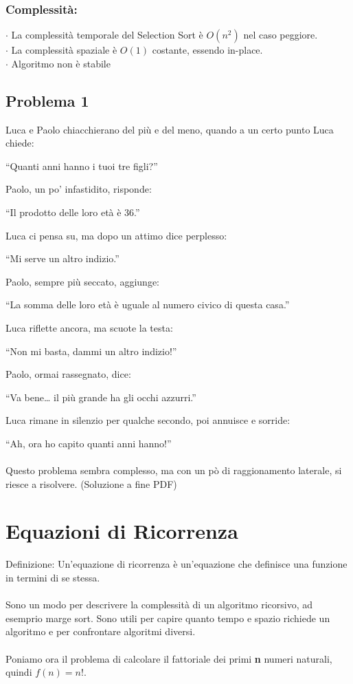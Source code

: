 \documentclass[a4paper,12pt]{article}
\begin{document}
\subsubsection*{{\textcolor{teorema}{Complessità: }}}
$\cdot $ La complessità temporale del Selection Sort è $O(n^2)$ nel caso peggiore. \\
$\cdot $ La complessità spaziale è $O(1)$ costante, essendo in-place. \\
$\cdot $ Algoritmo non è stabile


\subsection{Problema 1}
Luca e Paolo chiacchierano del più e del meno, quando a un certo punto Luca chiede:

``Quanti anni hanno i tuoi tre figli?''

Paolo, un po’ infastidito, risponde:

``Il prodotto delle loro età è 36.''

Luca ci pensa su, ma dopo un attimo dice perplesso:

``Mi serve un altro indizio.''

Paolo, sempre più seccato, aggiunge:

``La somma delle loro età è uguale al numero civico di questa casa.''

Luca riflette ancora, ma scuote la testa:

``Non mi basta, dammi un altro indizio!''

Paolo, ormai rassegnato, dice:

``Va bene… il più grande ha gli occhi azzurri.''

Luca rimane in silenzio per qualche secondo, poi annuisce e sorride:

``Ah, ora ho capito quanti anni hanno!''
\\
\\
Questo problema sembra complesso, ma con un pò di raggionamento laterale, si riesce a risolvere. (Soluzione a fine PDF)

\section{Equazioni di Ricorrenza}
\textcolor{teorema}{Definizione}: Un'equazione di ricorrenza è un'equazione che definisce una funzione in termini di se stessa. \\
\\
Sono un modo per descrivere la complessità di un algoritmo ricorsivo, ad esemprio marge sort.  Sono utili per capire quanto tempo e spazio richiede un algoritmo e per confrontare algoritmi diversi. \\
\\
Poniamo ora il problema di calcolare il fattoriale dei primi \textbf{n} numeri naturali, quindi $f(n) = n!$.
\end{document}
